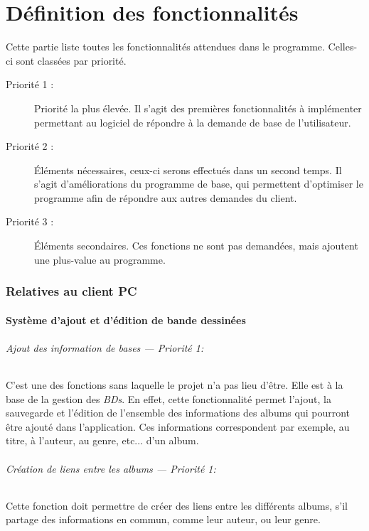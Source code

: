 \part{Définition des fonctionnalités}
Cette partie liste toutes les fonctionnalités attendues dans le programme. Celles-ci sont classées par priorité.

\begin{description}
\item [Priorité 1 :]
	Priorité la plus élevée. Il s'agit des premières fonctionnalités à implémenter permettant au logiciel de répondre à la demande de base de l'utilisateur.

\item [Priorité 2 :]
	Éléments nécessaires, ceux-ci serons effectués dans un second temps. Il s'agit d'améliorations du programme de base, qui permettent d'optimiser le programme afin de répondre aux autres demandes du client.  

\item [Priorité 3 :]
	Éléments secondaires. Ces fonctions ne sont pas demandées, mais ajoutent une plus-value au programme. 
\end{description}


\section{Relatives au client PC}

\subsection{Système d'ajout et d'édition de bande dessinées}
\paragraph{Ajout des information de bases ---  \textit{Priorité 1}:}
C'est une des fonctions sans laquelle le projet n'a pas lieu d'être. Elle est à la base de la gestion des \emph{BDs}. En effet, cette fonctionnalité permet l'ajout, la sauvegarde et l'édition de l'ensemble des informations des albums qui pourront être ajouté dans l'application. Ces informations correspondent par exemple, au titre, à l'auteur, au genre, etc... d'un album.

\paragraph{Création de liens entre les albums ---  \textit{Priorité 1}:}  
Cette fonction doit permettre de créer des liens entre les différents albums, s'il partage des informations en commun, comme leur auteur, ou leur genre.

